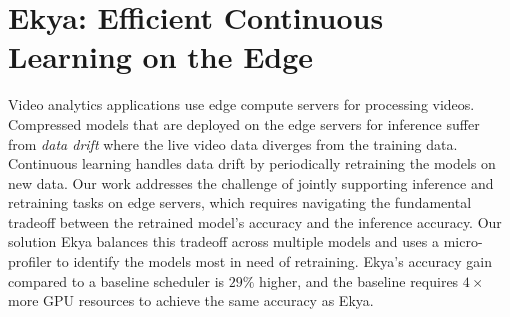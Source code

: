 \newcommand{\eg}{{\it e.g.,}\xspace}
\newcommand{\ie}{{\it i.e.,}\xspace}
\newcommand{\tbd}[1]{{\bf [[TBD: {#1}]]}}
\newcommand{\eat}[1]{}
\newcommand{\xref}[1]{\S\ref{#1}}
\newcommand{\name}{{Ekya}\xspace}
\newcommand{\fair}{uniform\xspace}
\newcommand{\Fair}{Uniform\xspace}
\newcommand{\myparashort}[1]{\vspace{0.07cm}\noindent{\bf {#1}}~}
\newcommand{\mypara}[1]{\vspace{0.07cm}\noindent{\bf {#1}:}~}
\newcommand{\myparaq}[1]{\vspace{0.07cm}\noindent{\bf {#1}?}~}

\chapter{Ekya: Efficient Continuous Learning on the Edge}
\label{ch_ekya}

Video analytics applications use edge compute servers for processing videos.  
Compressed models that are deployed on the edge servers for inference suffer from {\em data drift} where the live video data diverges from the training data. Continuous learning handles data drift by periodically retraining the models on new data. Our work addresses the challenge of jointly supporting inference and retraining tasks on edge servers, which requires navigating the fundamental tradeoff between the retrained model's accuracy and the inference accuracy. 
Our solution \name balances this tradeoff across multiple models and uses a micro-profiler to identify the models most in need of retraining. {\name}'s accuracy gain compared to a baseline scheduler is $29\%$ higher, and the baseline requires $4\times$ more GPU resources to achieve the same accuracy as \name.











%
%
%



%
% 
